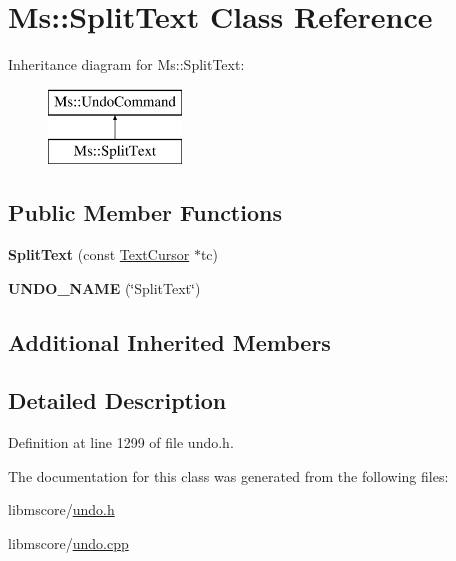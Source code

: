 \hypertarget{class_ms_1_1_split_text}{}\section{Ms\+:\+:Split\+Text Class Reference}
\label{class_ms_1_1_split_text}
Inheritance diagram for Ms\+:\+:Split\+Text\+:\begin{figure}[H]
\begin{center}
\leavevmode
\includegraphics[height=2.000000cm]{class_ms_1_1_split_text}
\end{center}
\end{figure}
\subsection*{Public Member Functions}
\begin{DoxyCompactItemize}
\item 
\mbox{\label{class_ms_1_1_split_text_a4d7355989e33676f0c9b7726a6591114}} 
{\bfseries Split\+Text} (const \hyperlink{class_ms_1_1_text_cursor}{Text\+Cursor} $\ast$tc)
\item 
\mbox{\label{class_ms_1_1_split_text_a5e9001a4c7aa9fc08db70f8138294cfd}} 
{\bfseries U\+N\+D\+O\+\_\+\+N\+A\+ME} (\char`\"{}Split\+Text\char`\"{})
\end{DoxyCompactItemize}
\subsection*{Additional Inherited Members}


\subsection{Detailed Description}


Definition at line 1299 of file undo.\+h.



The documentation for this class was generated from the following files\+:\begin{DoxyCompactItemize}
\item 
libmscore/\hyperlink{undo_8h}{undo.\+h}\item 
libmscore/\hyperlink{undo_8cpp}{undo.\+cpp}\end{DoxyCompactItemize}
